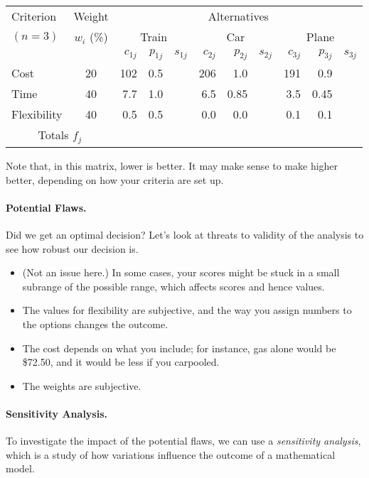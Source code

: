 {\Large
\begin{center}
\begin{tabular}{l|c|rrr|rrr|rrr}
Criterion & Weight & \multicolumn{9}{c}{Alternatives} \\
$(n=3)$ & $w_i$ (\%) & \multicolumn{3}{c|}{Train} & \multicolumn{3}{c|}{Car} & \multicolumn{3}{c}{Plane} \\
&& $c_{1j}$ & $p_{1j}$& $s_{1j}$ & $c_{2j}$ & $p_{2j}$ & $s_{2j}$ & $c_{3j}$ & $p_{3j}$ & $s_{3j}$ \\  \hline
Cost & 20 & 102 & 0.5 & & 206 & 1.0 & & 191 & 0.9 &  \\
Time & 40 & 7.7 & 1.0 & & 6.5 & 0.85 & & 3.5 & 0.45 \\
Flexibility & 40 & 0.5&0.5 &&0.0 &0.0 &&0.1 &0.1& \\ \hline
\multicolumn{2}{c|}{Totals $f_j$} & 
\end{tabular}
\end{center}
}
Note that, in this matrix, lower is better. It may make sense to make
higher better, depending on how your criteria are set up.

\paragraph{Potential Flaws.} Did we get an optimal decision? Let's
look at threats to validity of the analysis to see how robust our decision
is.

\begin{itemize}
\item (Not an issue here.) In some cases, your scores might be stuck in a
small subrange of the possible range, which affects scores and hence values.
\item The values for flexibility are subjective, and the way you assign
numbers to the options changes the outcome.
\item The cost depends on what you include; for instance, gas alone would
be \$72.50, and it would be less if you carpooled.
\item The weights are subjective.
\end{itemize}

\paragraph{Sensitivity Analysis.} To investigate the impact of the
potential flaws, we can use a \emph{sensitivity analysis}, which is
a study of how variations influence the outcome of a mathematical model.


